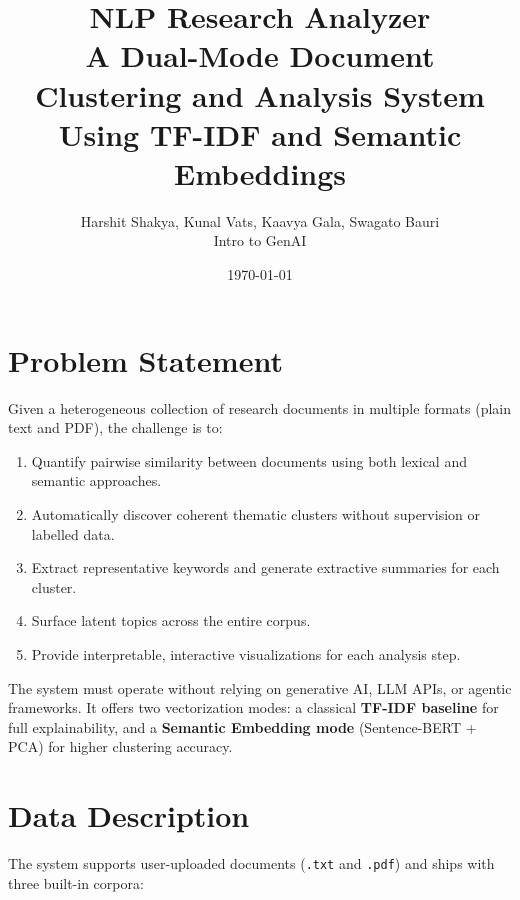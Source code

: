\documentclass[12pt, a4paper]{article}
\title{
    \vspace{-1cm}
    \textbf{NLP Research Analyzer} \\[0.3cm]
    \large A Dual-Mode Document Clustering and Analysis System \\
    Using TF-IDF and Semantic Embeddings
}
\author{
    Harshit Shakya,  Kunal Vats,  Kaavya Gala,  Swagato Bauri 
    \\[0.2cm]
    \small Intro to GenAI 
}
\date{\today}
\begin{document}
\maketitle

\section{Problem Statement}

Given a heterogeneous collection of research documents in multiple formats (plain text and PDF), the challenge is to:

\begin{enumerate}[nosep]
    \item Quantify pairwise similarity between documents using both lexical and semantic approaches.
    \item Automatically discover coherent thematic clusters without supervision or labelled data.
    \item Extract representative keywords and generate extractive summaries for each cluster.
    \item Surface latent topics across the entire corpus.
    \item Provide interpretable, interactive visualizations for each analysis step.
\end{enumerate}

The system must operate without relying on generative AI, LLM APIs, or agentic frameworks. It offers two vectorization modes: a classical \textbf{TF-IDF baseline} for full explainability, and a \textbf{Semantic Embedding mode} (Sentence-BERT + PCA) for higher clustering accuracy.

\section{Data Description}

The system supports user-uploaded documents (\texttt{.txt} and \texttt{.pdf}) and ships with three built-in corpora:
\end{document}
